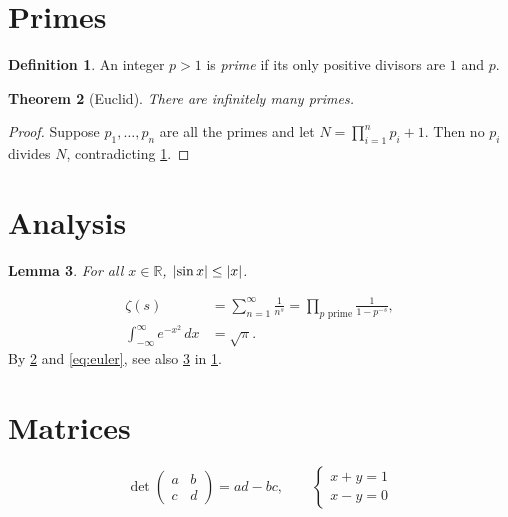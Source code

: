 \documentclass[11pt]{article}
\newtheorem{theorem}{Theorem}[section]
\newtheorem{lemma}[theorem]{Lemma}
\theoremstyle{definition}
\newtheorem{definition}[theorem]{Definition}
\DeclarePairedDelimiter\abs{\lvert}{\rvert}
\begin{document}
\tableofcontents
\section{Primes}\label{sec:primes}
\begin{definition}\label{def:prime}
An integer $p > 1$ is \emph{prime} if its only positive divisors are $1$ and $p$.
\end{definition}
\begin{theorem}[Euclid]\label{thm:infinite}
There are infinitely many primes.
\end{theorem}
\begin{proof}
Suppose $p_1, \dots, p_n$ are all the primes and let $N = \prod_{i=1}^{n} p_i + 1$.
Then no $p_i$ divides $N$, contradicting \cref{def:prime}.
\end{proof}
\section{Analysis}
\begin{lemma}\label{lem:bound}
For all $x \in \mathbb{R}$, $\abs*{\sin x} \le \abs{x}$.
\end{lemma}
\begin{align}
  \zeta(s) &= \sum_{n=1}^{\infty} \frac{1}{n^s} = \prod_{p \text{ prime}} \frac{1}{1 - p^{-s}}, \label{eq:euler}\\
  \int_{-\infty}^{\infty} e^{-x^2}\,dx &= \sqrt{\pi}.
\end{align}
By \cref{thm:infinite} and \eqref{eq:euler}, see also \cref{lem:bound} in \cref{sec:primes}.
\newpage
\section{Matrices}
\[
  \det\begin{pmatrix} a & b \\ c & d \end{pmatrix} = ad - bc,\qquad
  \begin{cases} x + y = 1 \\ x - y = 0 \end{cases}
\]
\end{document}
